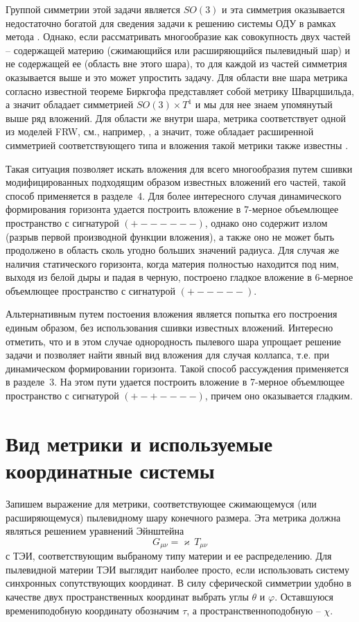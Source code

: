 \documentclass[12pt]{article}
\begin{document}
Группой симметрии этой задачи является $SO(3)$ и эта симметрия оказывается недостаточно богатой для сведения задачи
к решению системы ОДУ в рамках метода \cite{statja27}. Однако, если рассматривать многообразие как совокупность двух частей --
содержащей материю (сжимающийся или расширяющийся пылевидный шар) и не содержащей ее (область вне этого шара), то для каждой
из частей симметрия оказывается выше и это может упростить задачу. Для области вне шара метрика согласно известной теореме Биркгофа
представляет собой метрику Шварцшильда, а значит обладает симметрией $SO(3)\times T^1$ и мы для нее знаем
упомянутый выше ряд вложений. Для области же внутри шара, метрика соответствует одной из моделей FRW, см., например, \cite{landavshic2},
а значит, тоже обладает расширенной симметрией соответствующего типа и вложения такой метрики также известны \cite{robertson1933}.

Такая ситуация позволяет искать вложения для всего многообразия путем сшивки модифицированных подходящим образом
известных вложений его частей, такой способ применяется в разделе~4. Для более интересного случая динамического
формирования горизонта удается построить вложение в 7-мерное объемлющее пространство с сигнатурой $(+------)$,
однако оно содержит излом (разрыв первой производной функции вложения), а также оно не может быть продолжено
в область сколь угодно больших значений радиуса. Для случая же наличия статического горизонта, когда материя
полностью находится под ним, выходя из белой дыры и падая в черную, построено гладкое вложение
в 6-мерное объемлющее пространство с сигнатурой $(+-----)$.

Альтернативным путем постоения вложения является попытка его построения
единым образом, без использования сшивки известных вложений. Интересно отметить, что и в этом случае
однородность пылевого шара упрощает решение задачи и позволяет найти явный вид вложения для случая коллапса,
т.е. при динамическом формировании горизонта. Такой способ рассуждения применяется в разделе~3.
На этом пути удается построить вложение в 7-мерное объемлющее пространство с сигнатурой $(+-+----)$,
причем оно оказывается гладким.




\section{Вид метрики и используемые координатные системы}
Запишем выражение для метрики, соответствующее сжимающемуся (или расширяющемуся) пылевидному шару конечного размера.
Эта метрика должна являться решением уравнений Эйнштейна
\begin{equation}
\label{G=T}
	G_{\mu \nu} = \varkappa\, T_{\mu \nu}
\end{equation}
с ТЭИ, соответствующим выбраному типу материи и ее распределению.
Для пылевидной материи ТЭИ выглядит наиболее просто, если использовать систему синхронных сопутствующих координат.
В силу сферической симметрии удобно в качестве двух пространственных координат выбрать углы $\theta$ и $\varphi$.
Оставшуюся времениподобную координату обозначим $\tau$, а пространственноподобную -- $\chi$.
\end{document}
